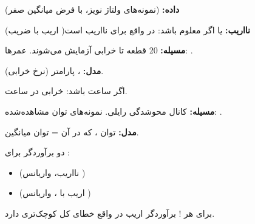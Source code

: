 \textbf{داده:}  (نمونه‌های ولتاژ نویز، با فرض میانگین صفر)

 (اریب با ضریب )\PSbr{}\textbf{نااریب:}  یا اگر  معلوم باشد:  در واقع برای  نااریب است


\textbf{مسیله:} 20 قطعه تا خرابی آزمایش می‌شوند. عمرها: .

\textbf{مدل:} ، پارامتر \lr{$\lambda$} (نرخ خرابی).


اگر  ساعت باشد:  خرابی در ساعت.


\textbf{مسیله:} کانال محوشدگی رایلی. نمونه‌های توان مشاهده‌شده: .

\textbf{مدل:} توان ، که در آن  = توان میانگین.




دو برآوردگر برای :

\begin{itemize}
\tightlist
\item
   (نااریب، واریانس )
\item
   (اریب با ، واریانس )
\end{itemize}

\PSbr{}

برای هر ! برآوردگر اریب  در واقع خطای کل کوچک‌تری دارد.

